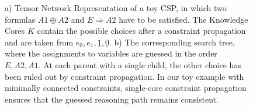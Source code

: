 \documentclass[aps,onecolumn,nofootinbib,pra]{article}
\begin{document}
\begin{figure}[t]
        \caption{a) Tensor Network Representation of a toy CSP, in which two formulas ${A1} \oplus {A2}$ and $E\Rightarrow {A2}$ have to be satisfied.
        The Knowledge Cores $K$ contain the possible choices after a constraint propagation and are taken from $e_0,e_1,\underline{1},\underline{0}$.
        b) The corresponding search tree, where the assignments to variables are guessed in the order $E,{A2},{A1}$.
        At each parent with a single child, the other choice has been ruled out by constraint propagation.
        In our toy example with minimally connected constraints, single-core constraint propagation ensures that the guessed reasoning path remains consistent.}
    \end{figure}

    
    
\end{document}
